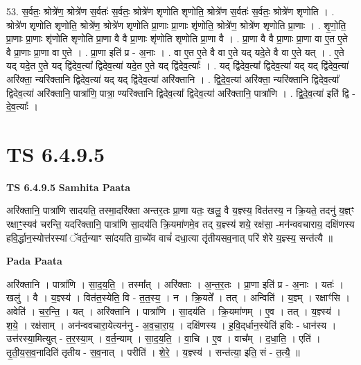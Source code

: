 \documentclass[17pt]{extarticle}
\begin{document}
53. स॒र्वतः॒ श्रोत्रे॑ण॒ श्रोत्रे॑ण स॒र्वतः॑ स॒र्वतः॒ श्रोत्रे॑ण शृणोति शृणोति॒ श्रोत्रे॑ण स॒र्वतः॑ स॒र्वतः॒ श्रोत्रे॑ण शृणोति । . श्रोत्रे॑ण शृणोति शृणोति॒ श्रोत्रे॑ण॒ श्रोत्रे॑ण शृणोति प्रा॒णाः प्रा॒णाः शृ॑णोति॒ श्रोत्रे॑ण॒ श्रोत्रे॑ण शृणोति प्रा॒णाः । . शृ॒णो॒ति॒ प्रा॒णाः प्रा॒णाः शृ॑णोति शृणोति प्रा॒णा वै वै प्रा॒णाः शृ॑णोति शृणोति प्रा॒णा वै । . प्रा॒णा वै वै प्रा॒णाः प्रा॒णा वा ए॒त ए॒ते वै प्रा॒णाः प्रा॒णा वा ए॒ते । . प्रा॒णा इति॑ प्र - अ॒नाः । . वा ए॒त ए॒ते वै वा ए॒ते यद् यदे॒ते वै वा ए॒ते यत् । . ए॒ते यद् यदे॒त ए॒ते यद् द्वि॑देव॒त्या᳚ द्विदेव॒त्या॑ यदे॒त ए॒ते यद् द्वि॑देव॒त्याः᳚ । . यद् द्वि॑देव॒त्या᳚ द्विदेव॒त्या॑ यद् यद् द्वि॑देव॒त्या॑ अरि॑क्ता॒ न्यरि॑क्तानि द्विदेव॒त्या॑ यद् यद् द्वि॑देव॒त्या॑ अरि॑क्तानि । . द्वि॒दे॒व॒त्या॑ अरि॑क्ता॒ न्यरि॑क्तानि द्विदेव॒त्या᳚ द्विदेव॒त्या॑ अरि॑क्तानि॒ पात्रा॑णि॒ पात्रा॒ ण्यरि॑क्तानि द्विदेव॒त्या᳚ द्विदेव॒त्या॑ अरि॑क्तानि॒ पात्रा॑णि । . द्वि॒दे॒व॒त्या॑ इति॑ द्वि - दे॒व॒त्याः᳚ । \newline
\pagebreak
{}

\section{ TS 6.4.9.5 }

\textbf{TS 6.4.9.5 } \newline
\textbf{Samhita Paata} \newline

अरि॑क्तानि॒ पात्रा॑णि सादयति॒ तस्मा॒दरि॑क्ता अन्तर॒तः प्रा॒णा यतः॒ खलु॒ वै य॒ज्ञ्स्य॒ वित॑तस्य॒ न क्रि॒यते॒ तदनु॑ य॒ज्ञ्ꣳ रक्षाꣳ॒॒स्यव॑ चरन्ति॒ यदरि॑क्तानि॒ पात्रा॑णि सा॒दय॑ति क्रि॒यमा॑णमे॒व तद् य॒ज्ञ्स्य॑ शये॒ रक्ष॑सा॒ -मन॑न्ववचाराय॒ दक्षि॑णस्य हवि॒र्द्धान॒स्योत्त॑रस्यां ॅवर्त॒न्याꣳ सा॑दयति वा॒च्ये॑व वाचं॑ दधा॒त्या तृ॑तीयसव॒नात् परि॑ शेरे य॒ज्ञ्स्य॒ सन्त॑त्यै ॥ \newline

\textbf{Pada Paata} \newline

अरि॑क्तानि । पात्रा॑णि । सा॒द॒य॒ति॒ । तस्मा᳚त् । अरि॑क्ताः । अ॒न्त॒र॒तः । प्रा॒णा इति॑ प्र - अ॒नाः । यतः॑ । खलु॑ । वै । य॒ज्ञ्स्य॑ । वित॑त॒स्येति॒ वि - त॒त॒स्य॒ । न । क्रि॒यते᳚ । तत् । अन्विति॑ । य॒ज्ञ्म् । रक्षाꣳ॑सि । अवेति॑ । च॒र॒न्ति॒ । यत् । अरि॑क्तानि । पात्रा॑णि । सा॒दय॑ति । क्रि॒यमा॑णम् । ए॒व । तत् । य॒ज्ञ्स्य॑ । श॒ये॒ । रक्ष॑साम् । अन॑न्ववचारा॒येत्यन॑नु - अ॒व॒चा॒रा॒य॒ । दक्षि॑णस्य । ह॒वि॒द्‌र्धान॒स्येति॑ हविः - धान॑स्य । उत्त॑रस्या॒मित्युत् - त॒र॒स्या॒म् । व॒र्त॒न्याम् । सा॒द॒य॒ति॒ । वा॒चि । ए॒व । वाच᳚म् । द॒धा॒ति॒ । एति॑ । तृ॒ती॒य॒स॒व॒नादिति॑ तृतीय - स॒व॒नात् । परीति॑ । शे॒रे॒ । य॒ज्ञ्स्य॑ । सन्त॑त्या॒ इति॒ सं - त॒त्यै॒ ॥  \newline
\end{document}
